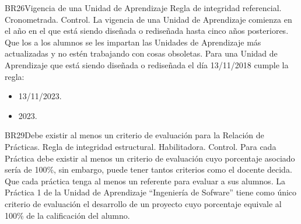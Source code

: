 \begin{BussinesRule}{BR26}{Vigencia de una Unidad de Aprendizaje}
    \BRitem[Tipo:] Regla de integridad referencial.
    \BRitem[Clase:] Cronometrada.
    \BRitem[Nivel:] Control.
    \BRitem[Descripción:] La vigencia de una Unidad de Aprendizaje comienza en el año en el que está siendo diseñada o rediseñada hasta cinco años posteriores.
    \BRitem[Motivación:] Que los a los alumnos se les impartan las Unidades de Aprendizaje más actualizadas y no estén trabajando con cosas obsoletas.
     Para una Unidad de Aprendizaje que está siendo diseñada o rediseñada el día 13/11/2018 cumple la regla:
        \begin{itemize}
            \item 13/11/2023.
            \item 2023.
        \end{itemize}
\end{BussinesRule}
\begin{BussinesRule}{BR29}{Debe existir al menos un criterio de evaluación para la Relación de Prácticas.}
    \BRitem[Tipo:] Regla de integridad estructural.
    \BRitem[Clase:] Habilitadora.
    \BRitem[Nivel:] Control.
    \BRitem[Descripción:] Para cada Práctica debe existir al menos un criterio de evaluación cuyo porcentaje asociado sería de 100\%, sin embargo, puede tener tantos criterios como el docente decida.
    \BRitem[Motivación:] Que cada práctica tenga al menos un referente para evaluar a sus alumnos.
     La Práctica 1 de la Unidad de Aprendizaje ``Ingeniería de Sofware'' tiene como único criterio de evaluación el desarrollo de un proyecto cuyo porcentaje equivale al 100\% de la calificación del alumno.
\end{BussinesRule}
